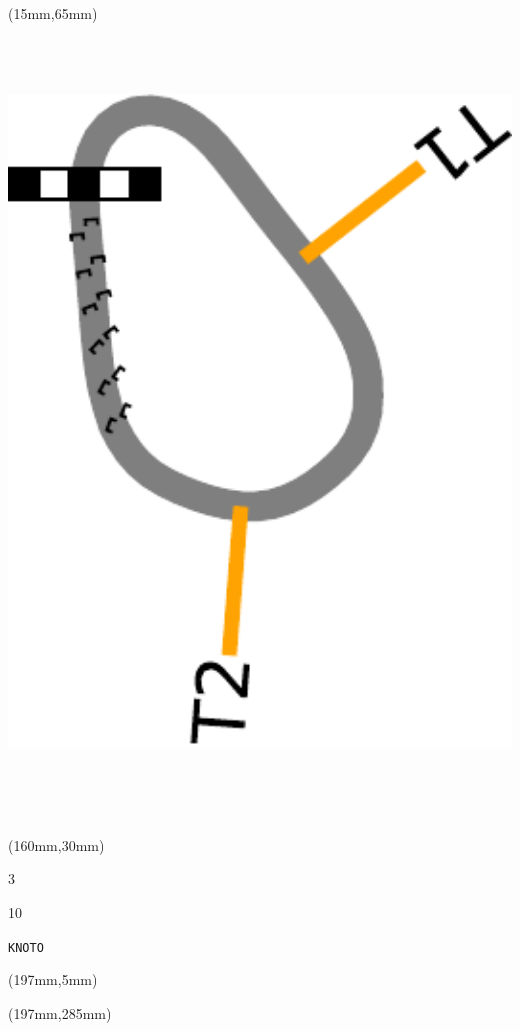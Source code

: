 \begin{textblock*}{185mm}(15mm,65mm)%
\centering
\mbox{\includegraphics[width=185mm,height=210mm,keepaspectratio]{PT/KNOTO.pdf}}
\end{textblock*}
\begin{textblock*}{40mm}(160mm,30mm)%
\Large
\par{} 
\par3 
\par10 
\par\hfill\tiny\tt KNOTO\\
\end{textblock*}
\begin{textblock*}{20mm}(197mm,5mm)%
\fbox{\thepage}
\label{KNOTO}
\end{textblock*}
\begin{textblock*}{20mm}(197mm,285mm)%
\fbox{\thepage}
\end{textblock*}

